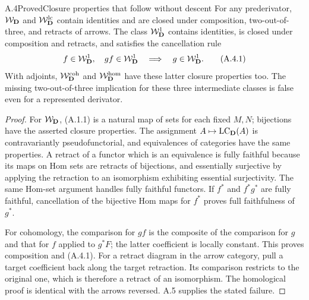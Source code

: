 \begin{claim}{A.4}{Proved}{Closure properties that follow without descent}
For any prederivator, $\mathcal W_{\mathbf D}$ and $\mathcal W_{\mathbf D}^{\mathrm{lc}}$ contain identities and are
closed under composition, two-out-of-three, and retracts of arrows.
The class $\mathcal W_{\mathbf D}^{1}$ contains identities, is closed under composition
and retracts, and satisfies the cancellation rule
\[
 f\in\mathcal W_{\mathbf D}^{1},\quad gf\in\mathcal W_{\mathbf D}^{1}\quad\Longrightarrow\quad g\in\mathcal W_{\mathbf D}^{1}.
 \tag{A.4.1}
\]
With adjoints, $\mathcal W_{\mathbf D}^{\mathrm{coh}}$ and $\mathcal W_{\mathbf D}^{\mathrm{hom}}$ have these latter closure
properties too. The missing two-out-of-three implication for these
three intermediate classes is false even for a represented derivator.
\end{claim}
\begin{proof}
For $\mathcal W_{\mathbf D}$, (A.1.1) is a natural map of sets for each fixed $M,N$;
bijections have the asserted closure properties. The assignment
$A\mapsto\operatorname{LC}_\mathbf D(A)$ is contravariantly pseudofunctorial, and
equivalences of categories have the same properties. A retract of a
functor which is an equivalence is fully faithful because its maps on
Hom sets are retracts of bijections, and essentially surjective by
applying the retraction to an isomorphism exhibiting essential
surjectivity. The same Hom-set argument handles fully faithful functors.
If $f^*$ and $f^*g^*$ are fully faithful, cancellation of the bijective
Hom maps for $f^*$ proves full faithfulness of $g^*$.

For cohomology, the comparison for $gf$ is the composite of the
comparison for $g$ and that for $f$ applied to $g^*F$; the latter
coefficient is locally constant. This proves composition and (A.4.1).
For a retract diagram in the arrow category, pull a target coefficient
back along the target retraction. Its comparison restricts to the
original one, which is therefore a retract of an isomorphism. The
homological proof is identical with the arrows reversed. A.5 supplies
the stated failure.
\end{proof}

